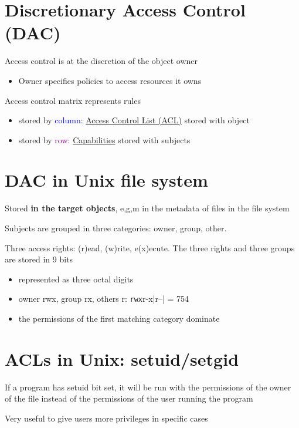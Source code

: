 \documentclass[11pt]{article}
\begin{document}
\newpage

\section*{Discretionary Access Control (DAC)}

Access control is at the discretion of the object owner
\begin{itemize}
	\item Owner specifies policies to access resources it owns
\end{itemize}

Access control matrix represents rules
\begin{itemize}
	\item stored by \textcolor{blue}{column}: \underline{Access Control List (ACL)} stored with object
	\item stored by \textcolor{purple}{row}: \underline{Capabilities} stored with subjects
\end{itemize}

\section*{DAC in Unix file system}

Stored \textbf{in the target objects}, e,g,m in the metadata of files in the file system

Subjects are grouped in three categories: owner, group, other.

Three access rights: (r)ead, (w)rite, e(x)ecute. The three rights and three groups are stored in 9 bits
\begin{itemize}
	\item represented as three octal digits
	\item owner rwx, group rx, others r: \verb|rwx|r-x|r--| = 754
	\item the permissions of the first matching category dominate
\end{itemize}

\section*{ACLs in Unix: setuid/setgid}

If a program has setuid bit set, it will be run with the permissions of the owner of the file instead of the permissions of the user running the program

Very useful to give users more privileges in specific cases
\end{document}
